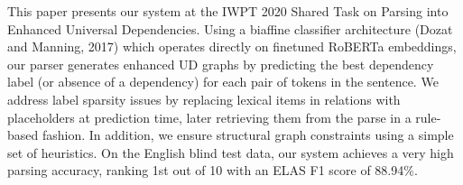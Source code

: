 This paper presents our system at the IWPT 2020 Shared Task on Parsing into Enhanced Universal Dependencies. Using a biaffine classifier architecture (Dozat and Manning, 2017) which operates directly on finetuned RoBERTa embeddings, our parser generates enhanced UD graphs by predicting the best dependency label (or absence of a dependency) for each pair of tokens in the sentence. We address label sparsity issues by replacing lexical items in relations with placeholders at prediction time, later retrieving them from the parse in a rule-based fashion. In addition, we ensure structural graph constraints using a simple set of heuristics. On the English blind test data, our system achieves a very high parsing accuracy, ranking 1st out of 10 with an ELAS F1 score of 88.94\%.
